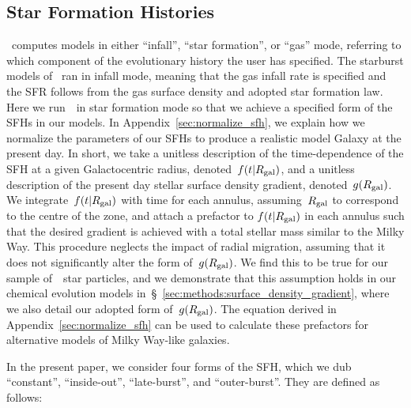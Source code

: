\documentclass[draft2.tex]{subfiles}
\begin{document}
\subsection{Star Formation Histories} 
\label{sec:methods:sfhs} 
\vice~computes models in either ``infall'', ``star formation'', or ``gas'' 
mode, referring to which component of the evolutionary history the user has 
specified. 
The starburst models of~\citet{Johnson2020} ran in infall mode, 
meaning that the gas infall rate is specified and the SFR follows from the gas 
surface density and adopted star formation law. 
Here we run~\vice~in star formation mode so that we achieve a specified form of 
the SFHs in our models. 
In Appendix~\ref{sec:normalize_sfh}, we explain how we normalize the parameters 
of our SFHs to produce a realistic model Galaxy at the present day. 
In short, we take a unitless description of the time-dependence of the SFH at a 
given Galactocentric radius, denoted~$f(t|R_\text{gal})$, and a unitless description 
of the present day stellar surface density gradient, denoted~$g(R_\text{gal})$. 
We integrate~$f(t|R_\text{gal})$ with time for each annulus, assuming~$R_\text{gal}$ to 
correspond to the centre of the zone, and attach a prefactor to 
$f(t|R_\text{gal})$ in each annulus such that the desired gradient is achieved 
with a total stellar mass similar to the Milky Way. 
This procedure neglects the impact of radial migration, assuming that it does 
not significantly alter the form of~$g(R_\text{gal})$. 
We find this to be true for our sample of~\hsim~star particles, and we 
demonstrate that this assumption holds in our chemical evolution models 
in~\S~\ref{sec:methods:surface_density_gradient}, where we also detail our 
adopted form of~$g(R_\text{gal})$. 
The equation derived in Appendix~\ref{sec:normalize_sfh} can be used to 
calculate these prefactors for alternative models of Milky Way-like galaxies. 
\par 
In the present paper, we consider four forms of the SFH, which we dub 
``constant'', ``inside-out'', ``late-burst'', and ``outer-burst''. 
They are defined as follows: 
\end{document}
